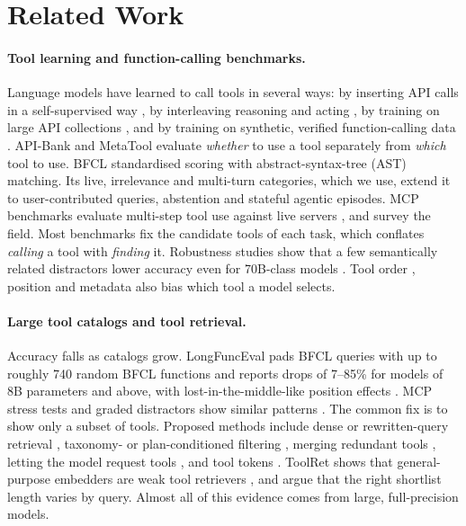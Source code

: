 \section{Related Work}
\label{sec:related}

\paragraph{Tool learning and function-calling benchmarks.}
Language models have learned to call tools in several ways: by inserting API calls in a self-supervised way \citep{schick2023toolformer}, by interleaving reasoning and acting \citep{yao2023react}, by training on large API collections \citep{patil2024gorilla, qin2024toolllm}, and by training on synthetic, verified function-calling data \citep{liu2024apigen, liu2025toolace}.
API-Bank \citep{li2023apibank} and MetaTool \citep{huang2024metatool} evaluate \emph{whether} to use a tool separately from \emph{which} tool to use. BFCL \citep{patil2025bfcl} standardised scoring with abstract-syntax-tree (AST) matching. Its live, irrelevance and multi-turn categories, which we use, extend it to user-contributed queries, abstention and stateful agentic episodes.
MCP benchmarks evaluate multi-step tool use against live servers \citep{wang2025mcpbench, luo2025mcpuniverse, mo2025livemcpbench, yin2025livemcp101}, and \citet{qu2025toolsurvey} survey the field.
Most benchmarks fix the candidate tools of each task, which conflates \emph{calling} a tool with \emph{finding} it.
Robustness studies show that a few semantically related distractors lower accuracy even for 70B-class models \citep{rabinovich2025robustness}. Tool order \citep{huang2024stability}, position \citep{blankenstein2026biasbusters} and metadata \citep{li2026metadata} also bias which tool a model selects.

\paragraph{Large tool catalogs and tool retrieval.}
Accuracy falls as catalogs grow.
LongFuncEval pads BFCL queries with up to roughly 740 random BFCL functions and reports drops of 7--85\% for models of 8B parameters and above, with lost-in-the-middle-like position effects \citep{kate2025longfunceval, liu2024lost}. MCP stress tests and graded distractors show similar patterns \citep{gan2025ragmcp, choi2026toolmath}.
The common fix is to show only a subset of tools. Proposed methods include dense or rewritten-query retrieval \citep{chen2024reinvoke, qu2024colt, mudunuri2026semantic}, taxonomy- or plan-conditioned filtering \citep{antonioni2025jsplit, patel2026dtdr, babu2026toolchoiceconfusion}, merging redundant tools \citep{liu2026toolscope}, letting the model request tools \citep{fei2025mcpzero}, and tool tokens \citep{wang2025toolgen}.
ToolRet shows that general-purpose embedders are weak tool retrievers \citep{shi2025toolret}, and \citet{repantis2026howmany} argue that the right shortlist length varies by query.
Almost all of this evidence comes from large, full-precision models.

